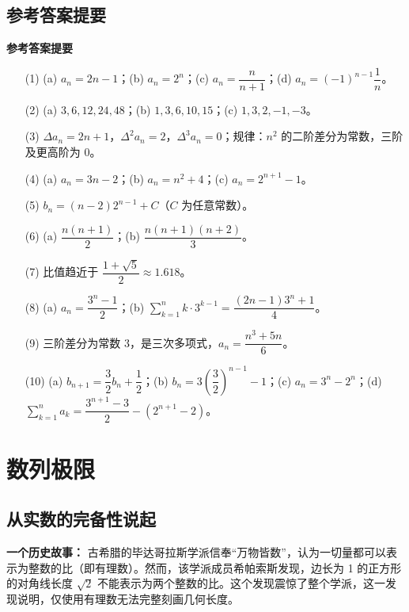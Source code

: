 \documentclass[fontset=fandol]{ctexart}
\newenvironment{custom}[1]{\par\noindent\textbf{#1}\quad}{\par\vspace{0.8em}}
\begin{document}
\newpage 

\subsection*{参考答案提要}
\begin{custom}{参考答案提要}

\begin{enumerate}
\item[(1)] (a) \(a_n = 2n-1\)；(b) \(a_n = 2^n\)；(c) \(a_n = \dfrac{n}{n+1}\)；(d) \(a_n = (-1)^{n-1} \dfrac{1}{n}\)。
\item[(2)] (a) \(3, 6, 12, 24, 48\)；(b) \(1, 3, 6, 10, 15\)；(c) \(1, 3, 2, -1, -3\)。
\item[(3)] \(\Delta a_n = 2n+1\)，\(\Delta^2 a_n = 2\)，\(\Delta^3 a_n = 0\)；规律：\(n^2\) 的二阶差分为常数，三阶及更高阶为 0。
\item[(4)] (a) \(a_n = 3n-2\)；(b) \(a_n = n^2 + 4\)；(c) \(a_n = 2^{n+1} - 1\)。
\item[(5)] \(b_n = (n-2)2^{n-1} + C\)（\(C\) 为任意常数）。
\item[(6)] (a) \(\dfrac{n(n+1)}{2}\)；(b) \(\dfrac{n(n+1)(n+2)}{3}\)。
\item[(7)] 比值趋近于 \(\dfrac{1+\sqrt{5}}{2} \approx 1.618\)。
\item[(8)] (a) \(a_n = \dfrac{3^n - 1}{2}\)；(b) \(\sum_{k=1}^{n} k \cdot 3^{k-1} = \dfrac{(2n-1)3^n + 1}{4}\)。
\item[(9)] 三阶差分为常数 3，是三次多项式，\(a_n = \dfrac{n^3 + 5n}{6}\)。
\item[(10)] (a) \(b_{n+1} = \dfrac{3}{2} b_n + \dfrac{1}{2}\)；(b) \(b_n = 3\left(\dfrac{3}{2}\right)^{n-1} - 1\)；(c) \(a_n = 3^n - 2^n\)；(d) \(\sum_{k=1}^{n} a_k = \dfrac{3^{n+1} - 3}{2} - (2^{n+1} - 2)\)。
\end{enumerate}
\end{custom}

\clearpage
\section{数列极限}

\subsection{从实数的完备性说起}

\textbf{一个历史故事：} 古希腊的毕达哥拉斯学派信奉“万物皆数”，认为一切量都可以表示为整数的比（即有理数）。然而，该学派成员希帕索斯发现，边长为 1 的正方形的对角线长度 \(\sqrt{2}\) 不能表示为两个整数的比。这个发现震惊了整个学派，这一发现说明，仅使用有理数无法完整刻画几何长度。
\end{document}
